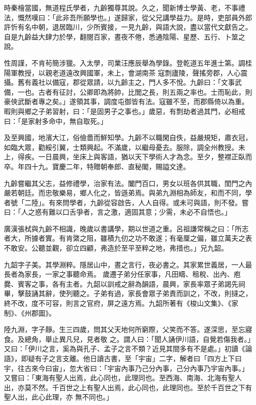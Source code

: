 \begin{pinyinscope}
 時秦檜當國，無道程氏學者，九齡獨尊其說。久之，聞新博士學黃、老，不事禮法，慨然嘆曰：「此非吾所願學也。」遂歸家，從父兄講學益力。是時，吏部員外郎許忻有名中朝，退居臨川，少所賓接，一見九齡，與語大說，盡以當代文獻告之。自是九齡益大肆力於學，翻閱百家，晝夜不倦，悉通陰陽、星歷、五行、卜筮之說。



 性周謹，不肯茍簡涉獵。入太學，司業汪應辰舉為學錄。登乾道五年進士第。調桂陽軍教授，以親老道遠改興國軍，未上，會湖南茶
 寇剽廬陵，聲搖旁郡，人心震攝。舊有義社以備寇，郡從眾請，以九齡主之，門人多不悅。九齡曰：「文事武備，一也。古者有征討，公卿即為將帥，比閭之長，則五兩之率也。士而恥此，則豪俠武斷者專之矣。」遂領其事，調度屯御皆有法。寇雖不至，而郡縣倚以為重。暇則與鄉之子弟習射，曰：「是固男子之事也。」歲惡，有剽劫者過其門，必相戒曰：「是家射多命中，無自取死。」



 及至興國，地濱大江，俗儉嗇而鮮知學。九齡不以職閑自佚，益嚴規矩，肅衣冠，
 如臨大眾，勸綏引翼，士類興起。不滿歲，以繼母憂去。服除，調全州教授。未上，得疾。一日晨興，坐床上與客語，猶以天下學術人才為念。至夕，整襟正臥而卒。年四十九。寶慶二年，特贈朝奉郎、直秘閣，賜謚文達。



 九齡嘗繼其父志，益修禮學，治家有法。闔門百口，男女以班各供其職，閨門之內嚴若朝廷。而忠敬樂易，鄉人化之，皆遜弟焉。與弟九淵相為師友，和而不同，學者號「二陸」。有來問學者，九齡從容啟告，人人自得。或未可與語，則不發。嘗
 曰：「人之惑有難以口舌爭者，言之激，適固其意；少需，未必不自悟也。」



 廣漢張栻與九齡不相識，晚歲以書講學，期以世道之重。呂祖謙常稱之曰：「所志者大，所據者實。有肯綮之阻，雖積九仞之功不敢遂；有毫厘之偏，雖立萬夫之表不敢安。公聽並觀，卻立四顧，弗造於至平至粹之地，弗措也。」兄九韶。



 九韶字子美。其學淵粹。隱居山中，晝之言行，夜必書之。其家累世義居，一人最長者為家長，一家之事聽命焉。
 歲遷子弟分任家事，凡田疇、租稅、出內、庖爨、賓客之事，各有主者。九韶以訓戒之辭為韻語，晨興，家長率眾子弟謁先祠畢，擊鼓誦其辭，使列聽之。子弟有過，家長會眾子弟責而訓之，不改，則撻之，終不改，度不可容，則言之官府，屏之遠方焉。九韶所著有《梭山文集》、《家制》、《州郡圖》。



 陸九淵，字子靜。生三四歲，問其父天地何所窮際，父笑而不答。遂深思，至忘寢食。及總角，舉止異凡兒，見者敬
 之。謂人曰：「聞人誦伊川語，自覺若傷我者。」又曰：「伊川之言，奚為與孔子、孟子之言不類？近見其間多有不是處。」初讀《論語》，即疑有子之言支離。他日讀古書，至「宇宙」二字，解者曰「四方上下曰宇，往古來今曰宙」，忽大省曰：「宇宙內事乃己分內事，己分內事乃宇宙內事。」又嘗曰：「東海有聖人出焉，此心同也，此理同也。至西海、南海、北海有聖人出，亦莫不然。千百世之上有聖人出焉，此心同也，此理同也。至於千百世之下有聖人出，此心此理，亦
 無不同也。」




\end{pinyinscope}

